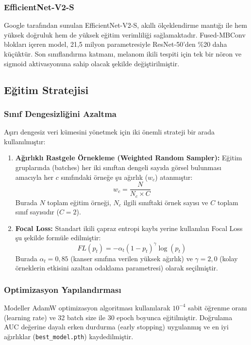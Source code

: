 \documentclass[12pt,a4paper]{article}
\begin{document}
\subsubsection{EfficientNet-V2-S}
Google tarafından sunulan EfficientNet-V2-S, akıllı ölçeklendirme mantığı ile hem yüksek doğruluk hem de yüksek eğitim verimliliği sağlamaktadır. Fused-MBConv blokları içeren model, 21,5 milyon parametresiyle ResNet-50'den \%20 daha küçüktür. Son sınıflandırma katmanı, melanom ikili tespiti için tek bir nöron ve sigmoid aktivasyonuna sahip olacak şekilde değiştirilmiştir.

\subsection{Eğitim Stratejisi}

\subsubsection{Sınıf Dengesizliğini Azaltma}
Aşırı dengesiz veri kümesini yönetmek için iki önemli strateji bir arada kullanılmıştır:
\begin{enumerate}
    \item \textbf{Ağırlıklı Rastgele Örnekleme (Weighted Random Sampler):} Eğitim gruplarında (batches) her iki sınıftan dengeli sayıda görsel bulunması amacıyla her $c$ sınıfındaki örneğe şu ağırlık ($w_c$) atanmıştır:
    \begin{equation}
        w_c = \frac{N}{N_c \times C}
    \end{equation}
    Burada $N$ toplam eğitim örneği, $N_c$ ilgili sınıftaki örnek sayısı ve $C$ toplam sınıf sayısıdır ($C=2$).
    \item \textbf{Focal Loss:} Standart ikili çapraz entropi kaybı yerine kullanılan Focal Loss şu şekilde formüle edilmiştir:
    \begin{equation}
        FL(p_t) = -\alpha_t (1 - p_t)^\gamma \log(p_t)
    \end{equation}
    Burada $\alpha_t=0,85$ (kanser sınıfına verilen yüksek ağırlık) ve $\gamma=2,0$ (kolay örneklerin etkisini azaltan odaklama parametresi) olarak seçilmiştir.
\end{enumerate}

\subsubsection{Optimizasyon Yapılandırması}
Modeller AdamW optimizasyon algoritması kullanılarak $10^{-4}$ sabit öğrenme oranı (learning rate) ve 32 batch size ile 30 epoch boyunca eğitilmiştir. Doğrulama AUC değerine dayalı erken durdurma (early stopping) uygulanmış ve en iyi ağırlıklar (\texttt{best\_model.pth}) kaydedilmiştir.
\end{document}
